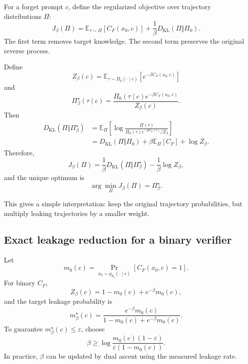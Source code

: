 \documentclass[10pt]{article}
\newcommand{\E}{\mathbb{E}}
\newcommand{\KL}{D_{\mathrm{KL}}}
\newcommand{\1}{\mathbb{I}}
\begin{document}
For a forget prompt $c$, define the regularized objective over trajectory distributions $\Pi$:
\begin{equation}
J_\beta(\Pi)
=
\E_{\tau\sim\Pi}[C_F(x_0,c)]
+
\frac{1}{\beta}\KL(\Pi\Vert\Pi_0).
\label{eq:regularized}
\end{equation}
The first term removes target knowledge. The second term preserves the original reverse process.

Define
\begin{equation}
Z_\beta(c)
=
\E_{\tau\sim\Pi_0(\cdot\mid c)}
\left[e^{-\beta C_F(x_0,c)}\right]
\end{equation}
and
\begin{equation}
\Pi_\beta^\star(\tau\mid c)
=
\frac{
\Pi_0(\tau\mid c)e^{-\beta C_F(x_0,c)}
}{Z_\beta(c)}.
\label{eq:tilted_trajectory}
\end{equation}
Then
\begin{align}
\KL(\Pi\Vert\Pi_\beta^\star)
&=
\E_{\Pi}\left[
\log\frac{\Pi(\tau)}{\Pi_0(\tau)e^{-\beta C_F(\tau)}/Z_\beta}
\right]\\
&=
\KL(\Pi\Vert\Pi_0)
+
\beta\E_{\Pi}[C_F]
+
\log Z_\beta.
\end{align}
Therefore,
\begin{equation}
J_\beta(\Pi)
=
\frac{1}{\beta}\KL(\Pi\Vert\Pi_\beta^\star)
-
\frac{1}{\beta}\log Z_\beta,
\end{equation}
and the unique optimum is
\begin{equation}
\arg\min_\Pi J_\beta(\Pi)=\Pi_\beta^\star.
\end{equation}

This gives a simple interpretation: keep the original trajectory probabilities, but multiply leaking trajectories by a smaller weight.

\subsection{Exact leakage reduction for a binary verifier}

Let
\begin{equation}
m_0(c)=\Pr_{x_0\sim p_{\theta_0}(\cdot\mid c)}[C_F(x_0,c)=1].
\end{equation}
For binary $C_F$,
\begin{equation}
Z_\beta(c)=1-m_0(c)+e^{-\beta}m_0(c),
\end{equation}
and the target leakage probability is
\begin{equation}
m_\beta^\star(c)
=
\frac{e^{-\beta}m_0(c)}{1-m_0(c)+e^{-\beta}m_0(c)}.
\label{eq:ideal_leakage}
\end{equation}
To guarantee $m_\beta^\star(c)\leq\varepsilon$, choose
\begin{equation}
\beta
\geq
\log\frac{m_0(c)(1-\varepsilon)}{\varepsilon(1-m_0(c))}.
\end{equation}
In practice, $\beta$ can be updated by dual ascent using the measured leakage rate.
\end{document}
